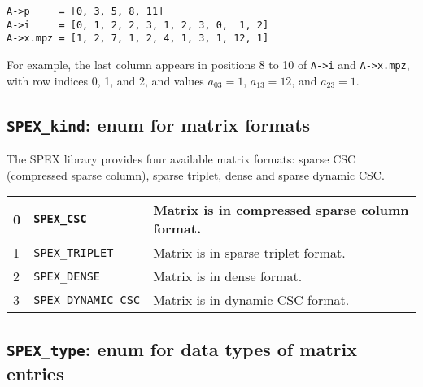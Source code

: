\documentclass[12pt]{report}
\theoremstyle{definition}
\begin{document}
\begin{verbatim}
A->p     = [0, 3, 5, 8, 11]
A->i     = [0, 1, 2, 2, 3, 1, 2, 3, 0,  1, 2]
A->x.mpz = [1, 2, 7, 1, 2, 4, 1, 3, 1, 12, 1]
\end{verbatim}

For example, the last column appears in positions 8 to 10 of \verb|A->i| and \verb|A->x.mpz|, with row indices 0, 1, and 2, and values $a_{03}=1$, $a_{13}=12$, and $a_{23}=1$.

\subsection{\texttt{SPEX\_kind}: enum for matrix formats}
\label{ss:SPEX_kind}

The SPEX library provides four available matrix formats: sparse CSC
(compressed sparse column), sparse triplet, dense and sparse dynamic CSC.

{\small
\begin{center}
\begin{tabular}{llp{4in}}
\hline
0 & \verb|SPEX_CSC| & Matrix is in compressed sparse column format. \\
\hline
1 & \verb|SPEX_TRIPLET|      & Matrix is in sparse triplet format. \\
\hline
2 & \verb|SPEX_DENSE|        & Matrix is in dense format.\\
\hline
3 & \verb|SPEX_DYNAMIC_CSC| & Matrix is in dynamic CSC format. \\
\hline
\end{tabular}
\label{tab:SPEX_kind}
\end{center}
}

\subsection{\texttt{SPEX\_type}: enum for data types of matrix entries}
\label{ss:SPEX_type}
\end{document}
